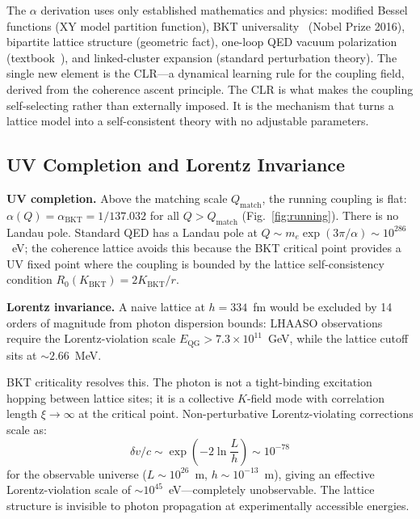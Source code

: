 \documentclass[aps,prd,onecolumn,superscriptaddress,floatfix,12pt]{revtex4-2}
\newcommand{\Rzero}{R_0}
\newcommand{\KBKT}{K_{\text{BKT}}}
\newcommand{\Qmatch}{Q_{\text{match}}}
\newcommand{\alphaBKT}{\alpha_{\text{BKT}}}
\begin{document}
The $\alpha$ derivation uses only established mathematics and physics: modified Bessel functions (XY model partition function), BKT universality~\cite{Berezinskii1971,Kosterlitz1973,Haldane2017} (Nobel Prize 2016), bipartite lattice structure (geometric fact), one-loop QED vacuum polarization (textbook~\cite{Schwinger1948}), and linked-cluster expansion (standard perturbation theory). The single new element is the CLR---a dynamical learning rule for the coupling field, derived from the coherence ascent principle. The CLR is what makes the coupling self-selecting rather than externally imposed. It is the mechanism that turns a lattice model into a self-consistent theory with no adjustable parameters.

\subsection{UV Completion and Lorentz Invariance}\label{sec:8-1b}

\textbf{UV completion.} Above the matching scale $\Qmatch$, the running coupling is flat: $\alpha(Q) = \alphaBKT = 1/137.032$ for all $Q > \Qmatch$ (Fig.~\ref{fig:running}). There is no Landau pole. Standard QED has a Landau pole at $Q \sim m_e \exp(3\pi/\alpha) \sim 10^{286}$~eV; the coherence lattice avoids this because the BKT critical point provides a UV fixed point where the coupling is bounded by the lattice self-consistency condition $\Rzero(\KBKT) = 2\KBKT/r$.

\textbf{Lorentz invariance.} A naive lattice at $h = 334$~fm would be excluded by 14 orders of magnitude from photon dispersion bounds: LHAASO observations~\cite{LHAASO2021} require the Lorentz-violation scale $E_{\text{QG}} > 7.3 \times 10^{11}$~GeV, while the lattice cutoff sits at $\sim 2.66$~MeV.

BKT criticality resolves this. The photon is not a tight-binding excitation hopping between lattice sites; it is a collective $K$-field mode with correlation length $\xi \to \infty$ at the critical point. Non-perturbative Lorentz-violating corrections scale as:
\begin{equation}
\delta v / c \sim \exp\!\left(-2\ln\frac{L}{h}\right) \sim 10^{-78}
\end{equation}
for the observable universe ($L \sim 10^{26}$~m, $h \sim 10^{-13}$~m), giving an effective Lorentz-violation scale of $\sim 10^{45}$~eV---completely unobservable. The lattice structure is invisible to photon propagation at experimentally accessible energies.
\end{document}
